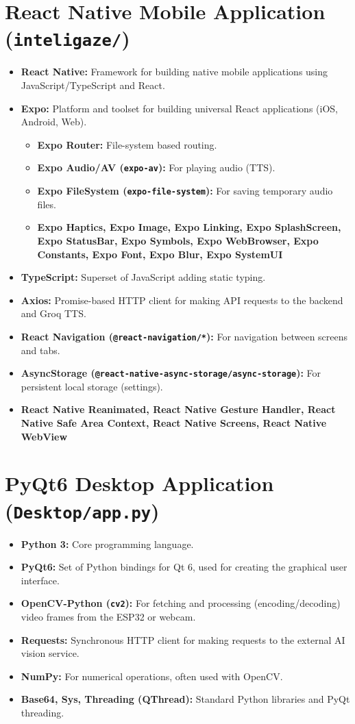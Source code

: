 \documentclass[12pt, a4paper]{report}
\begin{document}
\section{React Native Mobile Application (\texttt{inteligaze/})}
\begin{itemize}
    \item \textbf{React Native:} Framework for building native mobile applications using JavaScript/TypeScript and React.
    \item \textbf{Expo:} Platform and toolset for building universal React applications (iOS, Android, Web).
        \begin{itemize}
            \item \textbf{Expo Router:} File-system based routing.
            \item \textbf{Expo Audio/AV (\texttt{expo-av}):} For playing audio (TTS).
            \item \textbf{Expo FileSystem (\texttt{expo-file-system}):} For saving temporary audio files.
            \item \textbf{Expo Haptics, Expo Image, Expo Linking, Expo SplashScreen, Expo StatusBar, Expo Symbols, Expo WebBrowser, Expo Constants, Expo Font, Expo Blur, Expo SystemUI}
        \end{itemize}
    \item \textbf{TypeScript:} Superset of JavaScript adding static typing.
    \item \textbf{Axios:} Promise-based HTTP client for making API requests to the backend and Groq TTS.
    \item \textbf{React Navigation (\texttt{@react-navigation/*}):} For navigation between screens and tabs.
    \item \textbf{AsyncStorage (\texttt{@react-native-async-storage/async-storage}):} For persistent local storage (settings).
    \item \textbf{React Native Reanimated, React Native Gesture Handler, React Native Safe Area Context, React Native Screens, React Native WebView}
\end{itemize}

\section{PyQt6 Desktop Application (\texttt{Desktop/app.py})}
\begin{itemize}
    \item \textbf{Python 3:} Core programming language.
    \item \textbf{PyQt6:} Set of Python bindings for Qt 6, used for creating the graphical user interface.
    \item \textbf{OpenCV-Python (\texttt{cv2}):} For fetching and processing (encoding/decoding) video frames from the ESP32 or webcam.
    \item \textbf{Requests:} Synchronous HTTP client for making requests to the external AI vision service.
    \item \textbf{NumPy:} For numerical operations, often used with OpenCV.
    \item \textbf{Base64, Sys, Threading (QThread):} Standard Python libraries and PyQt threading.
\end{itemize}
\end{document}
